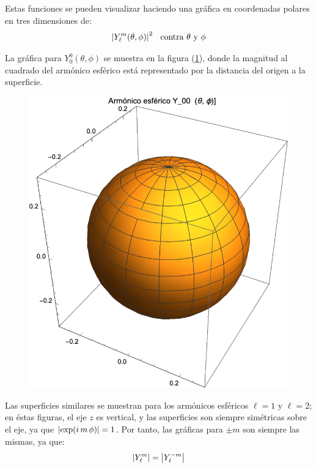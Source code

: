 Estas funciones se pueden visualizar haciendo una gráfica en coordenadas polares en tres dimensiones de:
\begin{align*}
\abs{Y_{\ell}^{m} (\theta, \phi)}^{2} \hspace{0.2cm} \mbox{ contra } \theta \mbox{ y } \phi
\end{align*}

La gráfica para $Y_{0}^{0} (\theta, \phi)$ se muestra en la figura (\ref{fig:armonico_esferico_00}), donde la magnitud al cuadrado del armónico esférico está representado por la distancia del origen a la superficie.
\begin{figure}[H]
    \centering
    \includegraphics[scale=1]{Imagenes/Armonicos_Esfericos_00.eps}
    \label{fig:armonico_esferico_00}
\end{figure}

Las superficies similares se muestran para los armónicos esféricos $\ell = 1$ y $\ell = 2$; en éstas figuras, el eje $z$ es vertical, y las superficies son siempre simétricas sobre el eje, ya que $\abs{\exp(i \, m \, \phi)} = 1$. Por tanto, las gráficas para $\pm m$ son siempre las mismas, ya que:
\begin{align*}
\abs{Y_{\ell}^{m}} = \abs{Y_{\ell}^{-m}}
\end{align*}

